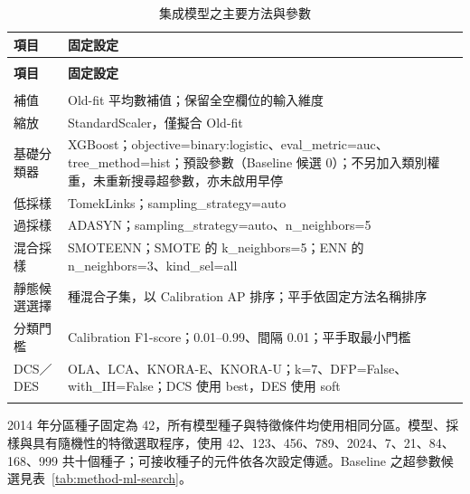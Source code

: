 \begin{longtable}{@{}>{\raggedright\arraybackslash}p{}>{\raggedright\arraybackslash}p{}@{}}
\caption{集成模型之主要方法與參數}\label{tab:method-parameters}\\
\toprule
\textbf{項目} & \textbf{固定設定} \\
\midrule
\endfirsthead
\multicolumn{2}{c}{表~\thetable（續）}\\
\toprule
\textbf{項目} & \textbf{固定設定} \\
\midrule
\endhead
\midrule
\multicolumn{2}{r}{續下頁}\\
\endfoot
\bottomrule
\endlastfoot
補值 & Old-fit 平均數補值；保留全空欄位的輸入維度 \\
\addlinespace[2pt]
縮放 & StandardScaler，僅擬合 Old-fit \\
\addlinespace[2pt]
基礎分類器 & XGBoost；{\normalfont objective=\allowbreak{}binary:logistic}、{\normalfont eval\_\allowbreak{}metric=\allowbreak{}auc}、{\normalfont tree\_\allowbreak{}method=\allowbreak{}hist}；預設參數（Baseline 候選 0）；不另加入類別權重，未重新搜尋超參數，亦未啟用早停 \\
\addlinespace[2pt]
低採樣 & TomekLinks；{\normalfont sampling\_\allowbreak{}strategy=\allowbreak{}auto} \\
\addlinespace[2pt]
過採樣 & ADASYN；{\normalfont sampling\_\allowbreak{}strategy=\allowbreak{}auto}、{\normalfont n\_\allowbreak{}neighbors=\allowbreak{}5} \\
\addlinespace[2pt]
混合採樣 & SMOTEENN；SMOTE 的 {\normalfont k\_\allowbreak{}neighbors=\allowbreak{}5}；ENN 的 {\normalfont n\_\allowbreak{}neighbors=\allowbreak{}3}、{\normalfont kind\_\allowbreak{}sel=\allowbreak{}all} \\
\addlinespace[2pt]
靜態候選選擇 & 49 種混合子集，以 Calibration AP 排序；平手依固定方法名稱排序 \\
\addlinespace[2pt]
分類門檻 & Calibration F1-score；0.01–0.99、間隔 0.01；平手取最小門檻 \\
\addlinespace[2pt]
DCS／DES & OLA、LCA、KNORA-E、KNORA-U；{\normalfont k=\allowbreak{}7}、{\normalfont DFP=\allowbreak{}False}、{\normalfont with\_\allowbreak{}IH=\allowbreak{}False}；DCS 使用 {\normalfont best}，DES 使用 {\normalfont soft} \\*
\end{longtable}
\endgroup

2014 年分區種子固定為 42，所有模型種子與特徵條件均使用相同分區。模型、採樣與具有隨機性的特徵選取程序，使用 42、123、456、789、2024、7、21、84、168、999 共十個種子；可接收種子的元件依各次設定傳遞。Baseline 之超參數候選見表~\ref{tab:method-ml-search}。


